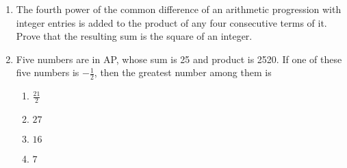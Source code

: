 \begin{enumerate}    [label=\thesubsection.\arabic*, ref=\thesubsection.\theenumi]
%       
			\hfill {}
%      
%
%
      \item The fourth power of the common difference of an arithmetic progression with integer entries is added to the product of any four consecutive terms of it. Prove that the resulting sum is the square of an integer.
%      
	      \hfill {}
%    
\item     Five numbers are in AP, whose sum is 25 and product is 2520. If one of these five numbers is $-\frac{1}{2}$, then the greatest number among them is
\hfill {}
%
\begin{multicols}{4}
\begin{enumerate}    
\item     $\frac{21}{2}$
\item     $27$
\item     $16$
\item     $7$
\end{enumerate}
\end{multicols}
%
%     
%
\end{enumerate}
